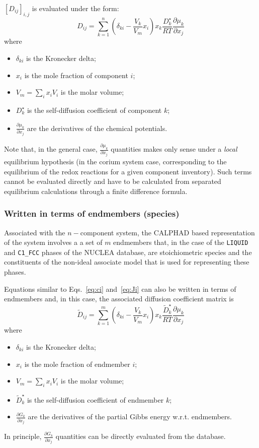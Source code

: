 \documentclass[3p]{elsarticle}
\newcommand{\T}{\texttt}
\newcommand{\Eqs}[2]{Eqs.~\ref{eq:#1} and~\ref{eq:#2}}
\newcommand{\MatrixIJ}[3]{\left[#1\right]_{#2,#3}}
\begin{document}
$\MatrixIJ{D_{ij}}{i}{j}$ is evaluated under the form:
\begin{equation}
 D_{ij} =  \sum_{k=1}^n \left(\delta_{ki} -\frac{V_k}{V_m} x_i\right) x_k \frac{D_k^\star}{RT} \frac{\partial \mu_k}{\partial x_j} 
\end{equation}
where 
\begin{itemize}
 \item $\delta_{ki}$ is the Kronecker delta;
 \item $x_i$ is the mole fraction of component $i$;
 \item $V_m = \sum_{i} x_i V_i$ is the molar volume;
 \item $D_k^\star$ is the self-diffusion coefficient of component $k$;
 \item $\frac{\partial \mu_k}{\partial x_j}$ are the derivatives of the chemical potentials.
\end{itemize}
Note that, in the general case, $\frac{\partial \mu_k}{\partial x_j}$ quantities makes only sense under a \emph{local} equilibrium hypothesis (in the corium system case, corresponding to the equilibrium of the redox reactions for a given component inventory). Such terms cannot be evaluated directly and have to be calculated from separated equilibrium calculations through a finite difference formula.

\subsubsection{Written in terms of endmembers (species)}

Associated with the $n-$component system, the CALPHAD based representation of the system involves a a set of $m$ endmembers that, in the case of the \T{LIQUID} and \T{C1\_FCC} phases of the NUCLEA database, are stoichiometric species and the constituents of the non-ideal associate model that is used for representing these phases. 

Equations similar to \Eqs{ci}{Ji} can also be written in terms of endmembers and, in this case, the associated diffusion coefficient matrix is
\begin{equation}
 \tilde{D}_{ij} =  \sum_{k=1}^m \left(\delta_{ki} -\frac{V_k}{V_m} x_i\right) x_k \frac{\tilde{D}_k^\star}{RT} \frac{\partial \mu_k}{\partial x_j} 
\end{equation}
where 
\begin{itemize}
 \item $\delta_{ki}$ is the Kronecker delta;
 \item $x_i$ is the mole fraction of endmember $i$;
 \item $V_m = \sum_{i} x_i V_i$ is the molar volume;
 \item $\tilde{D}_k^\star$ is the self-diffusion coefficient of endmember $k$;
 \item $\frac{\partial G_k}{\partial x_j}$ are the derivatives of the partial Gibbs energy w.r.t. endmembers.
\end{itemize}
In principle, $\frac{\partial G_k}{\partial x_j}$ quantities can be directly evaluated from the database.
\end{document}

